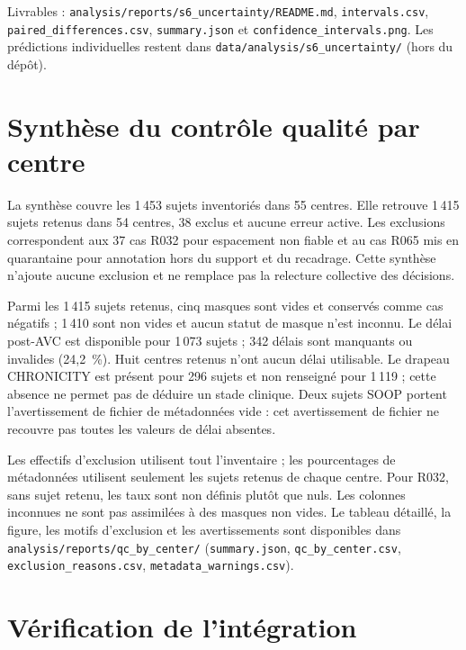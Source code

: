 Livrables : \nolinkurl{analysis/reports/s6_uncertainty/README.md}, \nolinkurl{intervals.csv}, \nolinkurl{paired_differences.csv}, \nolinkurl{summary.json} et \nolinkurl{confidence_intervals.png}.
Les prédictions individuelles restent dans \nolinkurl{data/analysis/s6_uncertainty/} (hors du dépôt).

\section{Synthèse du contrôle qualité par centre}
\label{sec:yosra-qc}

La synthèse couvre les 1\,453 sujets inventoriés dans 55 centres.
Elle retrouve 1\,415 sujets retenus dans 54 centres, 38 exclus et aucune erreur active.
Les exclusions correspondent aux 37 cas R032 pour espacement non fiable et au cas R065 mis en quarantaine pour annotation hors du support et du recadrage.
Cette synthèse n'ajoute aucune exclusion et ne remplace pas la relecture collective des décisions.

Parmi les 1\,415 sujets retenus, cinq masques sont vides et conservés comme cas négatifs ; 1\,410 sont non vides et aucun statut de masque n'est inconnu.
Le délai post-AVC est disponible pour 1\,073 sujets ; 342 délais sont manquants ou invalides (24,2~\%).
Huit centres retenus n'ont aucun délai utilisable.
Le drapeau CHRONICITY est présent pour 296 sujets et non renseigné pour 1\,119 ; cette absence ne permet pas de déduire un stade clinique.
Deux sujets SOOP portent l'avertissement de fichier de métadonnées vide : cet avertissement de fichier ne recouvre pas toutes les valeurs de délai absentes.

Les effectifs d'exclusion utilisent tout l'inventaire ; les pourcentages de métadonnées utilisent seulement les sujets retenus de chaque centre.
Pour R032, sans sujet retenu, les taux sont non définis plutôt que nuls.
Les colonnes inconnues ne sont pas assimilées à des masques non vides.
Le tableau détaillé, la figure, les motifs d'exclusion et les avertissements sont disponibles dans \nolinkurl{analysis/reports/qc_by_center/} (\nolinkurl{summary.json}, \nolinkurl{qc_by_center.csv}, \nolinkurl{exclusion_reasons.csv}, \nolinkurl{metadata_warnings.csv}).
\section{Vérification de l'intégration}
\label{sec:yosra-verification}

